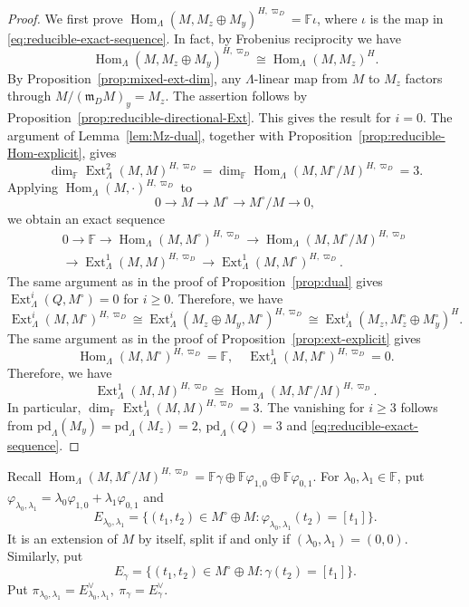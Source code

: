 \documentclass[11pt,a4paper]{article} %
\def\FF{\mathbb{F}}
\def\dim{\operatorname{dim}}
\def\Ext{\operatorname{Ext}} %
\def\Hom{\operatorname{Hom}}
\begin{document}
\begin{proof}
    We first prove $\Hom_\Lambda(M,M_z\oplus M_y)^{H,\varpi_D}=\FF\iota$, where $\iota$ is the map in \eqref{eq:reducible-exact-sequence}. In fact, by Frobenius reciprocity we have
    \[
    \Hom_\Lambda(M,M_z\oplus M_y)^{H,\varpi_D}\cong\Hom_\Lambda(M,M_z)^H.
    \]
    By Proposition~\ref{prop:mixed-ext-dim}, any $\Lambda$-linear map from $M$ to $M_z$ factors through $M/(\mathfrak m_DM)_y=M_z$. The assertion follows by Proposition~\ref{prop:reducible-directional-Ext}. This gives the result for $i=0$. The argument of Lemma~\ref{lem:Mz-dual}, together with Proposition~\ref{prop:reducible-Hom-explicit}, gives
    \[
    \dim_\FF\Ext^2_{\Lambda}(M,M)^{H,\varpi_D}=\dim_\FF\Hom_\Lambda(M,M^\circ/M)^{H,\varpi_D}=3.
    \]
    Applying $\Hom_\Lambda(M,\cdot)^{H,\varpi_D}$ to
    \[
    0\longrightarrow M\longrightarrow M^\circ\longrightarrow M^\circ/M\longrightarrow0,
    \]
    we obtain an exact sequence
    \[
    \begin{split}
        0\longrightarrow\FF\longrightarrow\Hom_\Lambda(M,M^\circ)^{H,\varpi_D}\longrightarrow\Hom_\Lambda(M,M^\circ/M)^{H,\varpi_D}\\
        \longrightarrow\Ext^1_{\Lambda}(M,M)^{H,\varpi_D}\longrightarrow\Ext^1_{\Lambda}(M,M^\circ)^{H,\varpi_D}.
    \end{split}
    \]
    The same argument as in the proof of Proposition~\ref{prop:dual} gives $\Ext^i_{\Lambda}(Q,M^\circ)=0$ for $i\ge0$. Therefore, we have
    \[
    \Ext^i_{\Lambda}(M,M^\circ)^{H,\varpi_D}\cong\Ext^i_{\Lambda}(M_z\oplus M_y,M^\circ)^{H,\varpi_D}\cong\Ext^i_{\Lambda}(M_z,M_z^\circ\oplus M_y^\circ)^H.
    \]
    The same argument as in the proof of Proposition~\ref{prop:ext-explicit} gives
    \[
    \Hom_\Lambda(M,M^\circ)^{H,\varpi_D}=\FF,\quad\Ext^1_{\Lambda}(M,M^\circ)^{H,\varpi_D}=0.
    \]
    Therefore, we have
    \[
    \Ext^1_{\Lambda}(M,M)^{H,\varpi_D}\cong\Hom_\Lambda(M,M^\circ/M)^{H,\varpi_D}.
    \]
    In particular, $\dim_\FF\Ext^1_{\Lambda}(M,M)^{H,\varpi_D}=3$. The vanishing for $i\ge3$ follows from $\mathrm{pd}_\Lambda(M_y)=\mathrm{pd}_\Lambda(M_z)=2$, $\mathrm{pd}_\Lambda(Q)=3$ and \eqref{eq:reducible-exact-sequence}.
\end{proof}

Recall $\Hom_\Lambda(M,M^\circ/M)^{H,\varpi_D}=\FF\gamma\oplus\FF\varphi_{1,0}\oplus\FF\varphi_{0,1}$. For $\lambda_0,\lambda_1\in\FF$, put $\varphi_{\lambda_0,\lambda_1}=\lambda_0\varphi_{1,0}+\lambda_1\varphi_{0,1}$ and
\[
E_{\lambda_0,\lambda_1}=\{(t_1,t_2)\in M^\circ\oplus M:\varphi_{\lambda_0,\lambda_1}(t_2)=[t_1]\}.
\]
It is an extension of $M$ by itself, split if and only if $(\lambda_0,\lambda_1)=(0,0)$. Similarly, put
\[
E_\gamma=\{(t_1,t_2)\in M^\circ\oplus M:\gamma(t_2)=[t_1]\}.
\]
Put $\pi_{\lambda_0,\lambda_1}=E_{\lambda_0,\lambda_1}^\vee,~\pi_\gamma=E_\gamma^\vee$.
\end{document}
